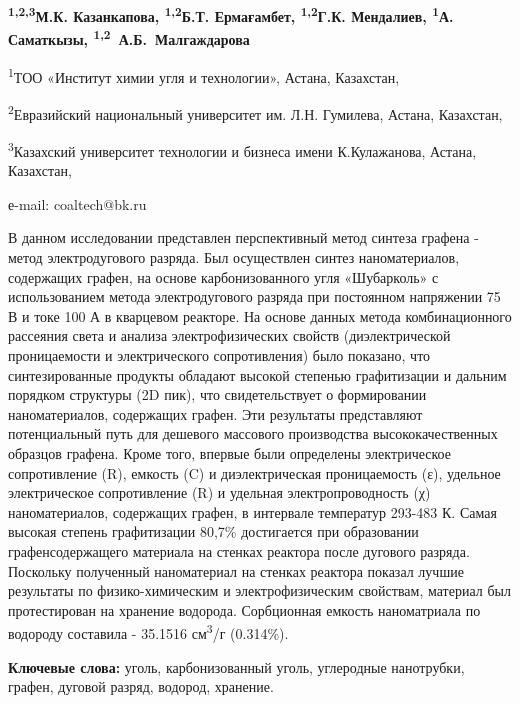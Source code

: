 
\begin{center}
{\bfseries \textsuperscript{1,2,3}М.К. Казанкапова,
\textsuperscript{1,2}Б.Т. Ермағамбет\envelope, \textsuperscript{1,2}Г.К.
Мендалиев, \textsuperscript{1}А. Саматкызы, \textsuperscript{1,2}~А.Б.~Малгаждарова}

\textsuperscript{1}ТОО «Институт химии угля и технологии», Астана,
Казахстан,

\textsuperscript{2}Евразийский национальный университет им. Л.Н.
Гумилева, Астана, Казахстан,

\textsuperscript{3}Казахский университет технологии и бизнеса имени
К.Кулажанова, Астана, Казахстан,

е-mail: coaltech@bk.ru
\end{center}

В данном исследовании представлен перспективный метод синтеза графена -
метод электродугового разряда. Был осуществлен синтез наноматериалов,
содержащих графен, на основе карбонизованного угля «Шубарколь» с
использованием метода электродугового разряда при постоянном напряжении
75 В и токе 100 А в кварцевом реакторе. На основе данных метода
комбинационного рассеяния света и анализа электрофизических свойств
(диэлектрической проницаемости и электрического сопротивления) было
показано, что синтезированные продукты обладают высокой степенью
графитизации и дальним порядком структуры (2D пик), что свидетельствует
о формировании наноматериалов, содержащих графен. Эти результаты
представляют потенциальный путь для дешевого массового производства
высококачественных образцов графена. Кроме того, впервые были определены
электрическое сопротивление (R), емкость (C) и диэлектрическая
проницаемость (ε), удельное электрическое сопротивление (R) и удельная
электропроводность (χ) наноматериалов, содержащих графен, в интервале
температур 293-483 К. Самая высокая степень графитизации 80,7\%
достигается при образовании графенсодержащего материала на стенках
реактора после дугового разряда. Поскольку полученный наноматериал на
стенках реактора показал лучшие результаты по физико-химическим и
электрофизическим свойствам, материал был протестирован на хранение
водорода. Сорбционная емкость наноматриала по водороду составила -
35.1516 см\textsuperscript{3}/г (0.314\%).

{\bfseries Ключевые слова:} уголь, карбонизованный уголь, углеродные
нанотрубки, графен, дуговой разряд, водород, хранение.


